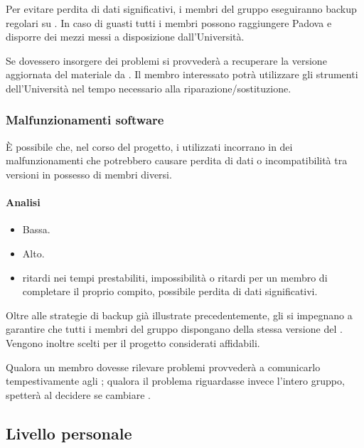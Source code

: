 \documentclass[a4paper, titlepage]{article}
\begin{document}
	Per evitare perdita di dati significativi, i membri del gruppo eseguiranno backup regolari su . In caso di guasti tutti i membri possono raggiungere Padova e disporre dei mezzi messi a disposizione dall'Università.
	
	Se dovessero insorgere dei problemi si provvederà a recuperare la versione aggiornata del materiale da .	Il membro interessato potrà utilizzare gli strumenti dell'Università nel tempo necessario alla riparazione/sostituzione.
	
	
	\subsubsection{Malfunzionamenti software}
	È possibile che, nel corso del progetto, i  utilizzati incorrano in dei malfunzionamenti che potrebbero causare perdita di dati o incompatibilità tra versioni in possesso di membri diversi.
	
	\paragraph {Analisi}
	\begin{itemize}
		\item {} Bassa.
		\item {} Alto.
		\item {} ritardi nei tempi prestabiliti, impossibilità o ritardi per un membro di completare il proprio compito, possibile perdita di dati significativi.
	\end{itemize}
	
	Oltre alle strategie di backup già illustrate precedentemente, gli  si impegnano a garantire che tutti i membri del gruppo dispongano della stessa versione del . Vengono inoltre scelti per il progetto  considerati affidabili.
	
	Qualora un membro dovesse rilevare problemi  provvederà a comunicarlo tempestivamente agli ; qualora il problema riguardasse invece l'intero gruppo, spetterà al  decidere se cambiare .
	
	
	\subsection{Livello personale}
\end{document}
